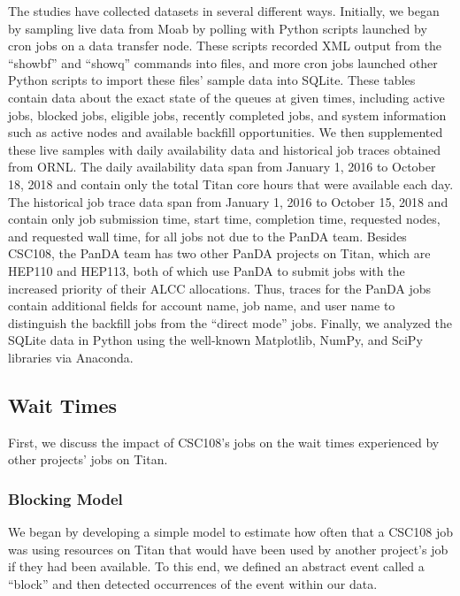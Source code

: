 The studies have collected datasets in several different ways. Initially, we
began by sampling live data from Moab by polling with Python scripts launched
by cron jobs on a data transfer node. These scripts recorded XML output from
the ``showbf'' and ``showq'' commands into files, and more cron jobs launched
other Python scripts to import these files' sample data into SQLite. These
tables contain data about the exact state of the queues at given times,
including active jobs, blocked jobs, eligible jobs, recently completed jobs,
and system information such as active nodes and available backfill
opportunities. We then supplemented these live samples with daily availability
data and historical job traces obtained from ORNL. The daily availability data
span from January 1, 2016 to October 18, 2018 and contain only the total Titan
core hours that were available each day. The historical job trace data span
from January 1, 2016 to October 15, 2018 and contain only job submission time,
start time, completion time, requested nodes, and requested wall time, for all
jobs not due to the PanDA team. Besides CSC108, the PanDA team has two other
PanDA projects on Titan, which are HEP110 and HEP113, both of which use PanDA
to submit jobs with the increased priority of their ALCC allocations. Thus,
traces for the PanDA jobs contain additional fields for account name, job name,
and user name to distinguish the backfill jobs from the ``direct mode'' jobs.
Finally, we analyzed the SQLite data in Python using the well-known Matplotlib,
NumPy, and SciPy libraries via Anaconda.

\subsection{Wait Times}
\label{subsec:waittimes}

First, we discuss the impact of CSC108's jobs on the wait times experienced by
other projects' jobs on Titan.

\subsubsection{Blocking Model}
\label{subsubsec:blockingmodel}

We began by developing a simple model to estimate how often that a CSC108 job
was using resources on Titan that would have been used by another project's job
if they had been available. To this end, we defined an abstract event called a
``block'' and then detected occurrences of the event within our data.

